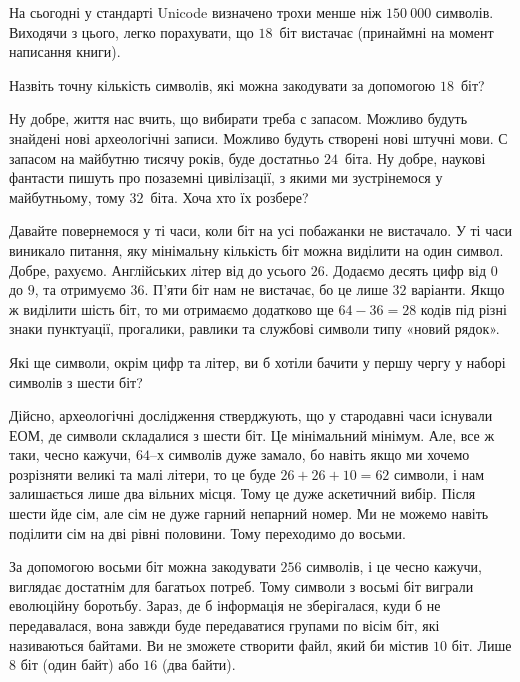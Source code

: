 На сьогодні у стандарті Unicode визначено трохи менше ніж $150~000$ символів.
Виходячи з цього, легко порахувати, що $18$~біт вистачає (принаймні на момент написання книги).

\begin{exercise}
Назвіть точну кількість символів, які можна закодувати за допомогою $18$~біт?
\end{exercise}

Ну добре, життя нас вчить, що вибирати треба с запасом.
Можливо будуть знайдені нові археологічні записи.
Можливо будуть створені нові штучні мови.
С запасом на майбутню тисячу років, буде достатньо $24$~біта.
Ну добре, наукові фантасти пишуть про позаземні цивілізації, з якими ми зустрінемося у майбутньому, тому $32$~біта.
Хоча хто їх розбере?

Давайте повернемося у ті часи, коли біт на усі побажанки не вистачало.
У ті часи виникало питання, яку мінімальну кількість біт можна виділити на один символ.
Добре, рахуємо.
Англійських літер від  до  усього $26$.
Додаємо десять цифр від $0$ до $9$, та отримуємо $36$.
П'яти біт нам не вистачає, бо це лише $32$ варіанти.
Якщо ж виділити шість біт, то ми отримаємо додатково ще $64-36=28$ кодів під різні знаки пунктуації, прогалики, равлики та службові символи типу «новий рядок».

\begin{exercise}
Які ще символи, окрім цифр та літер, ви б хотіли бачити у першу чергу у наборі символів з шести біт?
\end{exercise}

Дійсно, археологічні дослідження стверджують, що у стародавні часи існували ЕОМ, де символи складалися з шести біт.
Це мінімальний мінімум.
Але, все ж таки, чесно кажучи, $64$--х символів дуже замало, бо навіть якщо ми хочемо розрізняти великі та малі літери, то це буде $26+26+10=62$ символи, і нам залишається лише два вільних місця.
Тому це дуже аскетичний вибір.
Після шести йде сім, але сім не дуже гарний непарний номер.
Ми не можемо навіть поділити сім на дві рівні половини.
Тому переходимо до восьми.

За допомогою восьми біт можна закодувати $256$ символів, і це чесно кажучи, виглядає достатнім для багатьох потреб.
Тому символи з восьмі біт виграли еволюційну боротьбу.
Зараз, де б інформація не зберігалася, куди б не передавалася, вона завжди буде передаватися групами по вісім біт, які називаються байтами.
Ви не зможете створити файл, який би містив $10$ біт. Лише $8$ біт (один байт) або $16$ (два байти).

